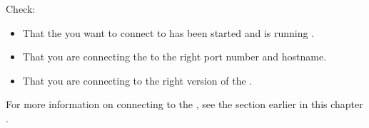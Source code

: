 


Check:
\begin{itemize}
\item That the \gdagent you want to connect to has been started and is running .
\item That you are connecting the \gdagent to the right port number and \gdagent hostname. 
\item That you are connecting to the right version of the \gdagent{}. 
 
\end{itemize}

For more information on connecting to the \gdagent, see the section earlier in this chapter .

